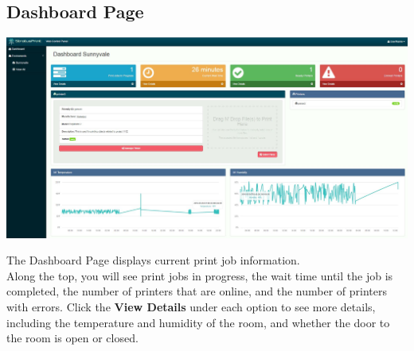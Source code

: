   \subsection{Dashboard Page}
      \begin{center}
      \includegraphics[scale=.15]{images/dash-user.png}
    \end{center}
      The Dashboard Page displays current print job information.\\
      Along the top, you will see print jobs in progress, the wait time until the job is completed, the number
      of printers that are online, and the number of printers with errors.  Click the \textbf{View Details} under
      each option to see more details, including the temperature and humidity of the room, and whether the door
      to the room is open or closed.

